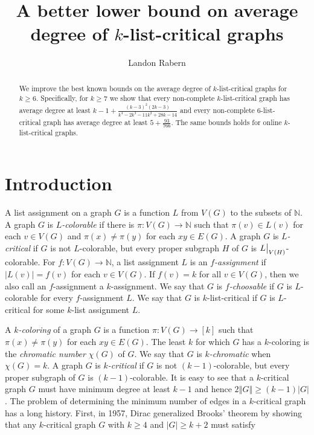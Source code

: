 \documentclass[10pt]{article}
\title{A better lower bound on average degree of $k$-list-critical graphs}
\author{Landon Rabern}
\theoremstyle{plain}
\theoremstyle{definition}
\theoremstyle{remark}
\newcommand{\IN}{\mathbb{N}}
\newcommand{\card}[1]{\left|#1\right|}
\newcommand{\size}[1]{\left\Vert#1\right\Vert}
\newcommand{\func}[3]{#1\colon #2 \rightarrow #3}
\newcommand{\irange}[1]{\left[#1\right]}
\newcommand\restr[2]{{%
  \left.\kern-\nulldelimiterspace %
  #1 %
  \vphantom{\big|} %
  \right|_{#2} %
  }}
\begin{document}
\maketitle

\begin{abstract}
		We improve the best known bounds on the average degree of $k$-list-critical graphs for $k \ge 6$. 
		Specifically, for $k \ge 7$ we show that every non-complete $k$-list-critical graph has average degree at least $k-1 + \frac{(k-3)^2 (2 k-3)}{k^4-2 k^3-11 k^2+28 k-14}$
		and every non-complete $6$-list-critical graph has average degree at least $5 + \frac{93}{766}$.
		The same bounds holds for online $k$-list-critical graphs.
\end{abstract}

\section{Introduction}


A list assignment on a graph $G$ is a function $L$ from $V(G)$ to the subsets of $\IN$.   
A graph $G$ is \emph{$L$-colorable} if there is $\func{\pi}{V(G)}{\IN}$ such that $\pi(v) \in L(v)$ for each $v \in V(G)$ and $\pi(x) \ne \pi(y)$ for each $xy \in E(G)$.   
A graph $G$ is \emph{$L$-critical} if $G$ is not $L$-colorable, but every proper subgraph $H$ of $G$ is $\restr{L}{V(H)}$-colorable. 
For $\func{f}{V(G)}{\IN}$, a list assignment $L$ is an \emph{$f$-assignment} if $\card{L(v)} = f(v)$ for each $v \in V(G)$.  
If $f(v) = k$ for all $v \in V(G)$, then we also call an $f$-assignment a $k$-assignment.  
We say that $G$ is \emph{$f$-choosable} if $G$ is $L$-colorable for every $f$-assignment $L$.  
We say that $G$ is $k$-list-critical if $G$ is $L$-critical for some $k$-list assignment $L$.

A \emph{$k$-coloring} of a graph $G$ is a function $\func{\pi}{V(G)}{\irange{k}}$ such that $\pi(x) \ne \pi(y)$ for each $xy \in E(G)$.  
The least $k$ for which $G$ has a $k$-coloring is the \emph{chromatic number} $\chi(G)$ of $G$. We say that $G$ is \emph{$k$-chromatic} when $\chi(G) = k$.  
A graph $G$ is \emph{$k$-critical} if $G$ is not $(k-1)$-colorable, but every proper subgraph of $G$ is $(k-1)$-colorable. 
It is easy to see that a $k$-critical graph $G$ must have minimum degree at least $k-1$ and hence $2\size{G} \ge (k-1)\card{G}$.  
The problem of determining the minimum number of edges in a $k$-critical graph has a long history. 
First, in 1957, Dirac \cite{dirac1957theorem} generalized Brooks' theorem \cite{brooks1941colouring} by showing that any $k$-critical graph $G$ 
with $k \ge 4$ and $\card{G} \ge k+2$ must satisfy 
\end{document}
